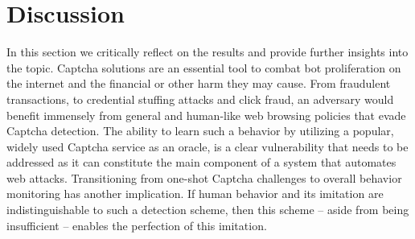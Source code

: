 \section{Discussion}
\label{sec:discussionre}

In this section we critically reflect on the results and provide further insights into the topic.
Captcha solutions are an essential tool to combat bot proliferation on the internet and the financial or other harm they may cause.
From fraudulent transactions, to credential stuffing attacks and click fraud, an adversary would benefit immensely from general and human-like web browsing policies that evade Captcha detection.
The ability to learn such a behavior by utilizing a popular, widely used Captcha service as an oracle, is a clear vulnerability that needs to be addressed as it can constitute the main component of a system that automates web attacks.
Transitioning from one-shot Captcha challenges to overall behavior monitoring has another implication.
If human behavior and its imitation are indistinguishable to such a detection scheme, then this scheme -- aside from being insufficient -- enables the perfection of this imitation.

